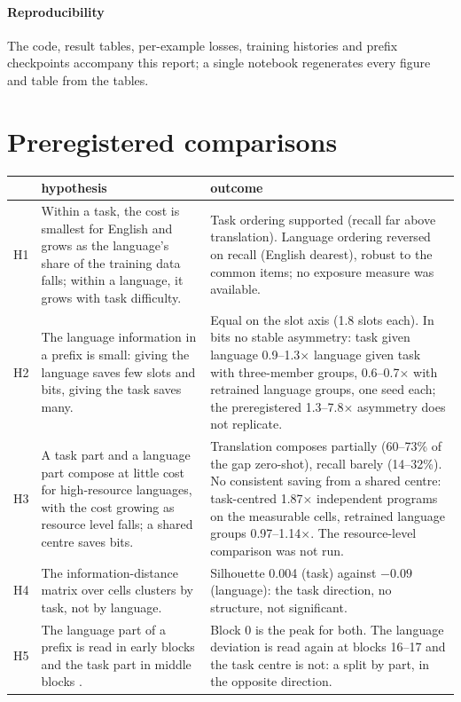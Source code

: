 \documentclass{article}
\begin{document}
\paragraph{Reproducibility}
The code, result tables, per-example losses, training histories and prefix checkpoints accompany this report; a single notebook regenerates every figure and table from the tables.





\clearpage
\appendix
\FloatBarrier
\section{Preregistered comparisons}\label{app:prereg}
\begin{table}[H]
\centering\small
\begin{tabular}{p{}p{}p{}}
\toprule
 & hypothesis & outcome \\
\midrule
H1 & Within a task, the cost is smallest for English and grows as the language's share of the training data falls; within a language, it grows with task difficulty. & Task ordering supported (recall far above translation). Language ordering reversed on recall (English dearest), robust to the common items; no exposure measure was available. \\
H2 & The language information in a prefix is small: giving the language saves few slots and bits, giving the task saves many. & Equal on the slot axis (1.8 slots each). In bits no stable asymmetry: task given language 0.9--1.3$\times$ language given task with three-member groups, 0.6--0.7$\times$ with retrained language groups, one seed each; the preregistered 1.3--7.8$\times$ asymmetry does not replicate. \\
H3 & A task part and a language part compose at little cost for high-resource languages, with the cost growing as resource level falls; a shared centre saves bits. & Translation composes partially (60--73\% of the gap zero-shot), recall barely (14--32\%). No consistent saving from a shared centre: task-centred 1.87$\times$ independent programs on the measurable cells, retrained language groups 0.97--1.14$\times$. The resource-level comparison was not run. \\
H4 & The information-distance matrix over cells clusters by task, not by language. & Silhouette 0.004 (task) against $-0.09$ (language): the task direction, no structure, not significant. \\
H5 & The language part of a prefix is read in early blocks and the task part in middle blocks \citep{dumas2025separating}. & Block 0 is the peak for both. The language deviation is read again at blocks 16--17 and the task centre is not: a split by part, in the opposite direction. \\

\end{tabular}
\end{table}
\end{document}
